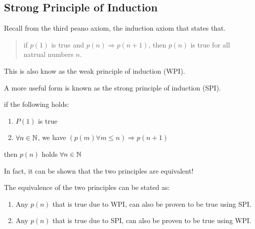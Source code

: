 \documentclass{article}
\begin{document}
\subsection{Strong Principle of Induction}
Recall from the third peano axiom, the induction axiom that states that.
\begin{quote}
    if $p(1)$ is true and $p(n) \Rightarrow p(n+1)$, then $p(n)$ is true for all natrual numbers $n$.
\end{quote}
This is also know as the weak principle of induction (WPI).

A more useful form is known as the strong principle of induction (SPI).

\begin{defi}
    if the following holds:
    \begin{enumerate}
        \item $P(1)$ is true
        \item $\forall n \in \mathbb{N}$, we have $(p(m) \forall m \leq n) \Rightarrow p(n + 1)$
    \end{enumerate}
    then $p(n)$ holds $\forall n \in \mathbb{N}$
\end{defi}

In fact, it can be shown that the two principles are equivalent!
\begin{prop}
    The equivalence of the two principles can be stated as:
    \begin{enumerate}
        \item Any $p(n)$ that is true due to WPI, can also be proven to be true using SPI.
        \item Any $p(n)$ that is true due to SPI, can also be proven to be true using WPI.
    \end{enumerate}
\end{prop}
\end{document}
